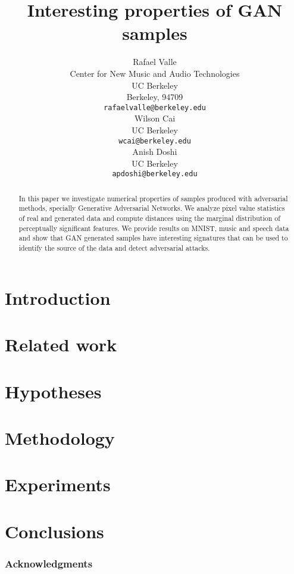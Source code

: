\documentclass{article}
\title{Interesting properties of GAN samples}
\author{
  Rafael Valle \\
  Center for New Music and Audio Technologies \\
  UC Berkeley \\
  Berkeley, 94709 \\
  \texttt{rafaelvalle@berkeley.edu} \\
  \And
  Wilson Cai\\
  UC Berkeley\\
  \texttt{wcai@berkeley.edu} \\
  \And
  Anish Doshi\\
  UC Berkeley\\
  \texttt{apdoshi@berkeley.edu} \\
}
\begin{document}

\maketitle

\begin{abstract}
    In this paper we investigate numerical properties of samples produced 
    with adversarial methods, specially Generative Adversarial Networks. We
    analyze pixel value statistics of real and generated data and compute
    distances using the marginal distribution of perceptually significant features. 
    We provide results on MNIST, music and speech data and show that GAN generated samples have 
    interesting signatures that can be used to identify the source of the data
    and detect adversarial attacks.
\end{abstract}

\theoremseparator{:}
\newtheorem{hyp}{Hypothesis}

\section{Introduction} \label{sec:introduction}

%
\section{Related work}\label{sec:related_work}

%
\section{Hypotheses}\label{sec:hypotheses}


\section{Methodology}\label{sec:method}

%
\section{Experiments}\label{sec:experiments}

%
\section{Conclusions}\label{sec:conclusions}

%

\subsubsection*{Acknowledgments}




\end{document}
